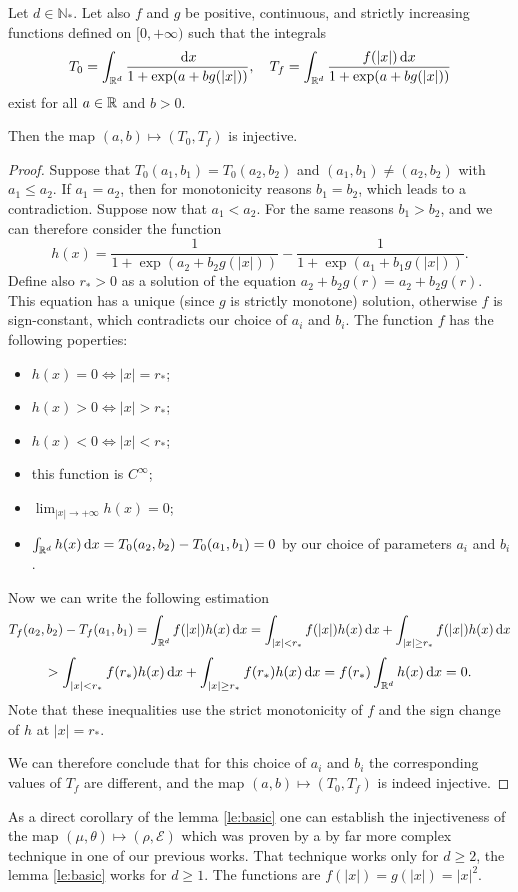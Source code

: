 \documentclass{article}
\begin{document}
\begin{lemma}
	Let $d\in\mathbb N_*$. Let also $f$ and $g$ be positive, continuous, and strictly increasing functions defined on $[0,+\infty)$ such that the integrals 
		\[
			T_0 = \int_{{\mathbb R^d}}^{}\frac{{\,\mathrm{d} x}}{1+\exp(a+bg(|x|))},\quad T_f = \int_{{\mathbb R^d}}^{}\frac{f(|x|){\,\mathrm{d} x}}{1+\exp(a+bg(|x|))}
		\]
		exist for all $a\in{\mathbb R}$ and $b>0$.

		Then the map $(a,b)\mapsto (T_0,T_f)$ is injective.
	\label{le:basic}
\end{lemma}
\begin{proof}
	Suppose that $T_0(a_1,b_1)=T_0(a_2,b_2)$ and $(a_1,b_1)\ne (a_2,b_2)$ with $a_1\le a_2$.
	If $a_1=a_2$, then for monotonicity reasons $b_1=b_2$, which leads to a contradiction.
	Suppose now that $a_1<a_2$.
	For the same reasons $b_1>b_2$, and we can therefore consider the function
	\[
		h(x) = \frac{1}{1+\exp(a_2+b_2g(|x|))}-\frac{1}{1+\exp(a_1+b_1g(|x|))}.
	\]
	Define also $r_*>0$ as a solution of the equation $a_2+b_2g(r)=a_2+b_2g(r)$. This equation has a unique (since $g$ is strictly monotone) solution, otherwise $f$ is sign-constant, which  contradicts our choice of $a_i$ and $b_i$.
	The function $f$ has the following poperties:
	\begin{itemize}
	\item $h(x)=0\iff |x|=r_*$;
	\item $h(x)>0\iff |x|>r_*$;
	\item $h(x)<0\iff |x|<r_*$;
	\item this function is $C^{\infty}$;
	\item $\lim_{|x|\to +\infty}h(x)=0$;
	\item $\int_{{\mathbb R^d}}^{}h(x){\,\mathrm{d} x}=T_0(a_2,b_2)-T_0(a_1,b_1)=0$ by our choice of parameters $a_i$ and $b_i$.
	\end{itemize}
	Now we can write the following estimation %
	\[
		T_f(a_2,b_2)-T_f(a_1,b_1)=\int_{{\mathbb R^d}}^{}f(|x|)h(x){\,\mathrm{d} x}=\int_{|x|<r_*}^{}f(|x|)h(x){\,\mathrm{d} x}+\int_{|x|\ge r_*}^{}f(|x|)h(x){\,\mathrm{d} x}
	\]
	\[
		> \int_{|x|<r_*}^{}f(r_*)h(x){\,\mathrm{d} x}+\int_{|x|\ge r_*}^{}f(r_*)h(x){\,\mathrm{d} x}=f(r_*)\int_{{\mathbb R^d}}^{}h(x){\,\mathrm{d} x}=0.
	\]
	Note that these inequalities use the strict monotonicity of $f$ and the sign change of $h$ at $|x|=r_*$.

	We can therefore conclude that for this choice of $a_i$ and $b_i$ the corresponding values of $T_f$ are different, and the map $(a,b)\mapsto (T_0,T_f)$ is indeed injective.

\end{proof}
\begin{corollary}
	As a direct corollary of the lemma \ref{le:basic} one can establish the injectiveness of the map 
	$(\mu,\theta)\mapsto (\rho, \mathcal E)$ which was proven by a by far more complex technique in one of our previous works. That technique works only for $d\ge2$, the lemma \ref{le:basic} works for $d\ge1$. The functions are $f(|x|)=g(|x|)=|x|^2$.
\end{corollary}
\end{document}
